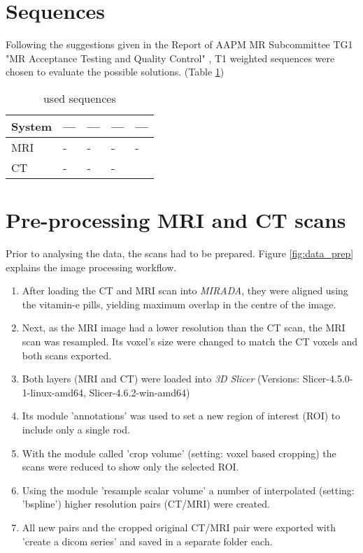 \section{Sequences}
Following the suggestions given in the Report of AAPM MR Subcommittee TG1 "MR Acceptance Testing and
Quality Control" \cite{Jackson2009}, T1 weighted sequences were chosen to evaluate the possible solutions. (Table \ref{tab:settings})

\begin{table}[h]
\centering
\begin{tabular}{@{}lllll@{}}
System & ---  & --- &  --- & --- \\
\toprule
MRI    & -   & -   & -   & -    \\
CT     & -   & -   & -   &
\end{tabular}
\caption{used sequences}
\label{tab:settings}
\end{table}



\section{Pre-processing MRI and CT scans}
\label{sec:prep}

Prior to analysing the data, the scans had to be prepared.
Figure \ref{fig:data_prep} explains the image processing workflow.

\begin{enumerate}[label=\textbf{Step \arabic*}]
\item After loading the CT and MRI scan into \textit{MIRADA}, they were aligned using the vitamin-e pills, yielding maximum overlap in the centre of the image.
\item Next, as the MRI image had a lower resolution than the CT scan, the MRI scan was resampled.
Its voxel's size were changed to match the CT voxels and both scans exported.
\item Both layers (MRI and CT) were loaded into \textit{3D Slicer} (Versions: Slicer-4.5.0-1-linux-amd64, Slicer-4.6.2-win-amd64)
\item Its module 'annotations' was used to set a new region of interest (ROI) to include only a single rod.
\item With the module called 'crop volume' (setting: voxel based cropping) the scans were reduced to show only the selected ROI.
\item Using the module 'resample scalar volume' a number of interpolated (setting: 'bspline') higher resolution pairs (CT/MRI) were created.
\item All new pairs and the cropped original CT/MRI pair were exported with 'create a dicom series' and saved in a separate folder each.
\end{enumerate}

